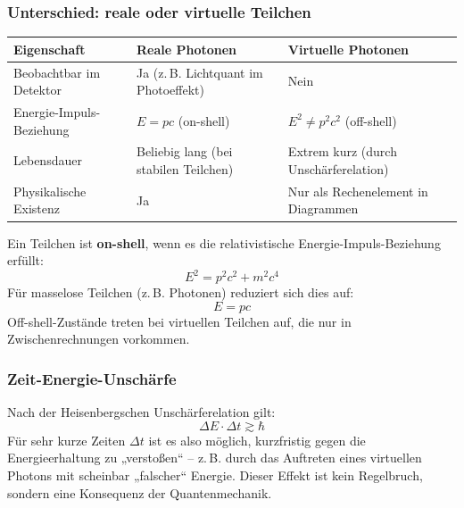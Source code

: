 \subsubsection*{Unterschied: reale  oder virtuelle Teilchen}
\begin{table}[H]
	\centering
	\scriptsize 

{\small
	\begin{center}
		\renewcommand{\arraystretch}{1.3}
		\begin{tabular}{|p{3cm}|p{3.0cm}|p{3.0cm}|}
			\hline
			\textbf{Eigenschaft} & \textbf{Reale Photonen} & \textbf{Virtuelle Photonen} \\
			\hline
			Beobachtbar im Detektor & Ja (z.\,B. Lichtquant im Photoeffekt) & Nein \\
			\hline
			Energie-Impuls-Beziehung & $E = pc$ (on-shell) & $E^2 \ne p^2 c^2$ (off-shell) \\
			\hline
			Lebensdauer & Beliebig lang (bei stabilen Teilchen) & Extrem kurz (durch Unschärferelation) \\
			\hline
			Physikalische Existenz & Ja & Nur als Rechenelement in Diagrammen \\
			\hline
		\end{tabular}
	\end{center}
}
\end{table}
\vspace{1em}

\begin{tcolorbox}[hinweisbox, title=On-shell-Bedingung]
	\label{box:On-shell-Bedingung}
	Ein Teilchen ist \textbf{on-shell}, wenn es die relativistische Energie-Impuls-Beziehung erfüllt:
	\[
	E^2 = p^2 c^2 + m^2 c^4
	\]
	Für masselose Teilchen (z.\,B. Photonen) reduziert sich dies auf:
	\[
	E = pc
	\]
	Off-shell-Zustände treten bei virtuellen Teilchen auf, die nur in Zwischenrechnungen vorkommen.
\end{tcolorbox}

\subsubsection*{Zeit-Energie-Unschärfe}
Nach der Heisenbergschen Unschärferelation gilt:
\[
\Delta E \cdot \Delta t \gtrsim \hbar
\]\index{$\hbar$}
Für sehr kurze Zeiten $\Delta t$ ist es also möglich, kurzfristig gegen die Energieerhaltung zu „verstoßen“ – z.\,B. durch das Auftreten eines virtuellen Photons mit scheinbar „falscher“ Energie.
Dieser Effekt ist kein Regelbruch, sondern eine Konsequenz der Quantenmechanik.

